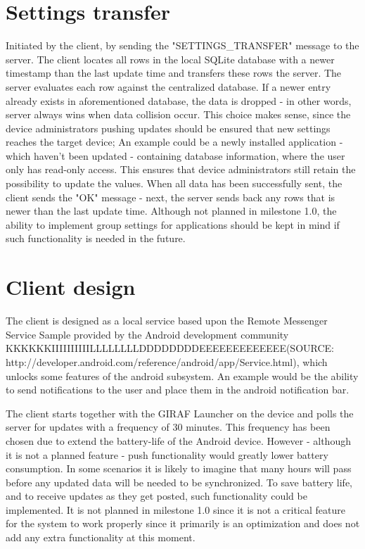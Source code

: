\section{Settings transfer}
Initiated by the client, by sending the "SETTINGS\_TRANSFER" message to the server. The client locates all rows in the local SQLite database with a newer timestamp than the last update time and transfers these rows the server. The server evaluates each row against the centralized database. If a newer entry already exists in aforementioned database, the data is dropped - in other words, server always wins when data collision occur. This choice makes sense, since the device administrators pushing updates should be ensured that new settings reaches the target device; An example could be a newly installed application - which haven't been updated - containing database information, where the user only has read-only access. This ensures that device administrators still retain the possibility to update the values.
When all data has been successfully sent, the client sends the "OK" message - next, the server sends back any rows that is newer than the last update time. Although not planned in milestone 1.0, the ability to implement group settings for applications should be kept in mind if such functionality is needed in the future. 


\section{Client design}
The client is designed as a local service based upon the Remote Messenger Service Sample provided by the Android development community KKKKKKIIIIIIIIIILLLLLLLLDDDDDDDDEEEEEEEEEEEEE(SOURCE: http://developer.android.com/reference/android/app/Service.html), which unlocks some features of the android subsystem. An example would be the ability to send notifications to the user and place them in the android notification bar.

The client starts together with the GIRAF Launcher on the device and polls the server for updates with a frequency of 30 minutes. This frequency has been chosen due to extend the battery-life of the Android device. However - although it is not a planned feature - push functionality would greatly lower battery consumption. In some scenarios it is likely to imagine that many hours will pass before any updated data will be needed to be synchronized. To save battery life, and to receive updates as they get posted, such functionality could be implemented. It is not planned in milestone 1.0 since it is not a critical feature for the system to work properly since it primarily is an optimization and does not add any extra functionality at this moment. 

